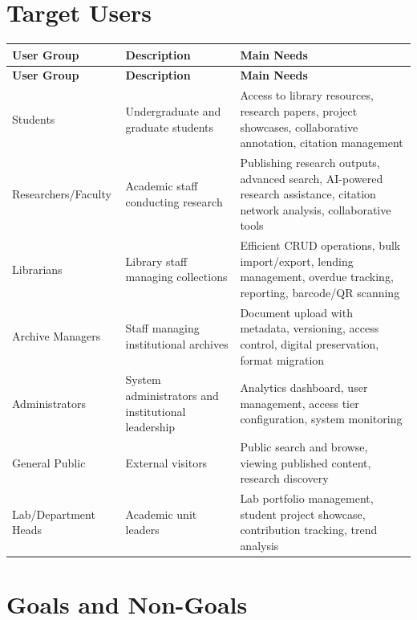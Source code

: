 \documentclass[12pt,a4paper]{report}
\begin{document}
\section{Target Users}
\begin{longtable}{|p{3cm}|p{5cm}|p{6cm}|}
\hline
\textbf{User Group} & \textbf{Description} & \textbf{Main Needs} \\ \hline
\endfirsthead
\hline
\textbf{User Group} & \textbf{Description} & \textbf{Main Needs} \\ \hline
\endhead
Students & Undergraduate and graduate students & Access to library resources, research papers, project showcases, collaborative annotation, citation management \\ \hline
Researchers/Faculty & Academic staff conducting research & Publishing research outputs, advanced search, AI-powered research assistance, citation network analysis, collaborative tools \\ \hline
Librarians & Library staff managing collections & Efficient CRUD operations, bulk import/export, lending management, overdue tracking, reporting, barcode/QR scanning \\ \hline
Archive Managers & Staff managing institutional archives & Document upload with metadata, versioning, access control, digital preservation, format migration \\ \hline
Administrators & System administrators and institutional leadership & Analytics dashboard, user management, access tier configuration, system monitoring \\ \hline
General Public & External visitors & Public search and browse, viewing published content, research discovery \\ \hline
Lab/Department Heads & Academic unit leaders & Lab portfolio management, student project showcase, contribution tracking, trend analysis \\ \hline
\end{longtable}

\section{Goals and Non-Goals}
\end{document}
